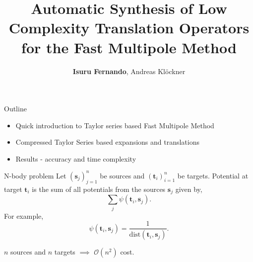 \documentclass[10pt,usenames,dvipsnames]{beamer}
\title{Automatic Synthesis of Low Complexity Translation Operators for the Fast Multipole Method}
\author{\textbf{Isuru Fernando}, Andreas Kl{\"o}ckner}
\def\b#1{\mathbf{ #1}}
\begin{document}
\maketitle

\begin{frame}[fragile]{Outline}
 \begin{itemize}
  \item Quick introduction to Taylor series based Fast Multipole Method
  \item Compressed Taylor Series based expansions and translations
  \item Results - accuracy and time complexity
 \end{itemize}

\end{frame}

\begin{frame}[fragile]{N-body problem}
Let $(\b s_j)_{j=1}^{n}$ be sources and $(\b t_i)_{i=1}^{n}$ be targets. Potential at target $\b t_i$ is the sum of all potentials from the sources $\b s_j$ given by,
\[\sum_{j} \psi(\b t_i, \b s_j).\]
For example, \[\psi(\b t_i, \b s_j) = \frac{1}{\text{dist}(\b t_i, \b s_j)}.\]
\begin{center}
\end{center}

$n$ sources and $n$ targets $\implies$  $\mathcal{O}(n^2)$ cost.

\end{frame}
\end{document}
